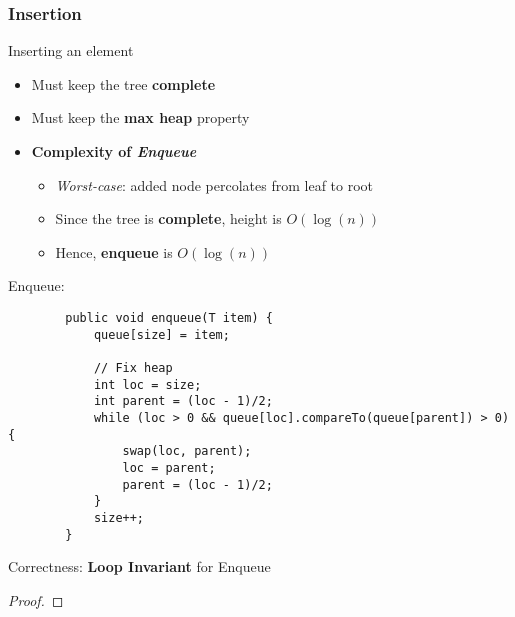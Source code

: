 \documentclass[10pt, 
a4paper, 
oneside, 
headinclude, footinclude, 
BCOR5mm]
{scrartcl}
\begin{document}
\newpage
\subsubsection{Insertion}
\begin{definition}
    Inserting an element
    \begin{itemize}
        \item Must keep the tree \textbf{complete}
        \item Must keep the \textbf{max heap} property
        \item \textbf{Complexity of \textit{Enqueue}}
        \begin{itemize}
            \item \textit{Worst-case}: added node percolates from leaf to root
            \item Since the tree is \textbf{complete}, height is $O(\log(n))$
            \item Hence, \textbf{enqueue} is $O(\log(n))$
        \end{itemize}
    \end{itemize}

    Enqueue:
    \begin{lstlisting}
        public void enqueue(T item) {
            queue[size] = item;

            // Fix heap
            int loc = size;
            int parent = (loc - 1)/2;
            while (loc > 0 && queue[loc].compareTo(queue[parent]) > 0) {
                swap(loc, parent);
                loc = parent;
                parent = (loc - 1)/2;
            }
            size++;
        }
    \end{lstlisting}
    Correctness: \textbf{Loop Invariant} for Enqueue
    \begin{proof}
        
    \end{proof}
\end{definition}
\newpage
\end{document}
